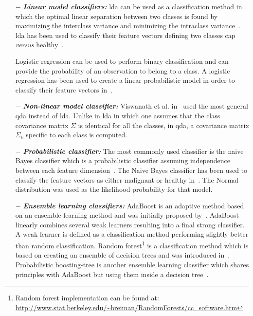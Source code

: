 \begin{enumerate}[leftmargin=*]
\item[$-$] \textbf{\textit{Linear model classifiers:}} \Acf{lda} can be used as a classification method in which the optimal linear separation between two classes is found by maximizing the interclass variance and minimizing the intraclass variance~\cite{Friedman1989}. \Ac{lda} has been used to classify their feature vectors defining two classes \ac{cap} \textit{versus} healthy~\cite{Antic2013,Chan2003,Litjens2014,Niaf2011,Niaf2012,Vos2012}.

  Logistic regression can be used to perform binary classification and can provide the probability of an observation to belong to a class. A logistic regression has been used to create a linear probabilistic model in order to classify their feature vectors in~\cite{Kelm2007,Puech2009}.

\item[$-$] \textbf{\textit{Non-linear model classifier:}} Viswanath et al. in~\cite{Viswanath2012} used the most general \acf{qda} instead of \ac{lda}. Unlike in \ac{lda} in which one assumes that the class covariance matrix $\Sigma$ is identical for all the classes, in \ac{qda}, a covariance matrix $\Sigma_k$ specific to each class is computed.

\item[$-$] \textbf{\textit{Probabilistic classifier:}} The most commonly used classifier is the naive Bayes classifier which is a probabilistic classifier assuming independence between each feature dimension~\cite{Rish2001}. The Naive Bayes classifier has been used to classify the feature vectors as either malignant or healthy in~\cite{Giannini2013,Mazzetti2011,Niaf2011,Niaf2012}. The Normal distribution was used as the likelihood probability for that model.

\item[$-$] \textbf{\textit{Ensemble learning classifiers:}} AdaBoost is an adaptive method based on an ensemble learning method and was initially proposed by~\cite{Freund1997}. AdaBoost linearly combines several weak learners resulting into a final strong classifier. A weak learner is defined as a classification method performing slightly better than random classification. Random forest\footnote{Random forest implementation can be found at: \url{http://www.stat.berkeley.edu/~breiman/RandomForests/cc\_software.htm}} is a classification method which is based on creating an ensemble of decision trees and was introduced in~\cite{Breiman2001}. Probabilistic boosting-tree is another ensemble learning classifier which shares principles with AdaBoost but using them inside a decision tree~\cite{Tu2005}. 


\end{enumerate}

